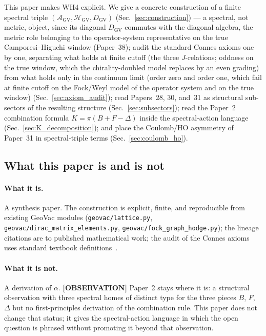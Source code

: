 \documentclass[11pt]{article}
\begin{document}
This paper makes WH4 explicit.  We give a concrete construction of a
finite spectral triple
$(\mathcal{A}_{\mathrm{GV}}, \mathcal{H}_{\mathrm{GV}},
D_{\mathrm{GV}})$ (Sec.~\ref{sec:construction}) --- a spectral, not
metric, object, since its diagonal $D_{\mathrm{GV}}$ commutes with the
diagonal algebra, the metric role belonging to the operator-system
representative on the true Camporesi--Higuchi window (Paper~38);
audit the standard Connes axioms one by one, separating
what holds at finite cutoff (the three $J$-relations; oddness on
the true window, which the chirality-doubled model replaces by an even
grading) from what holds only in the continuum limit (order zero and
order one, which fail at finite cutoff on the Fock/Weyl
model of the operator system and on the true window) (Sec.~\ref{sec:axiom_audit}); read
Papers~28, 30, and~31 as structural sub-sectors of the resulting
structure (Sec.~\ref{sec:subsectors}); read the Paper~2 combination
formula $K = \pi(B + F - \Delta)$ inside the spectral-action language
(Sec.~\ref{sec:K_decomposition}); and place the Coulomb/HO asymmetry
of Paper~31 in spectral-triple terms (Sec.~\ref{sec:coulomb_ho}).

\subsection{What this paper is and is not}

\paragraph{What it is.}  A synthesis paper.  The construction is
explicit, finite, and reproducible from existing GeoVac modules
(\texttt{geovac/lattice.py}, \texttt{geovac/dirac\_matrix\_elements.py},
\texttt{geovac/fock\_graph\_hodge.py}); the lineage citations are to
published mathematical work; the audit of the Connes axioms uses
standard textbook definitions~\cite{connes1995,connes_marcolli2008,%
vansuijlekom_book2015}.

\paragraph{What it is not.}  A derivation of $\alpha$.
\textbf{[OBSERVATION]} Paper~2 stays
where it is: a structural observation with three spectral
homes of distinct type for the three pieces $B$, $F$, $\Delta$ but no first-principles
derivation of the combination rule.  This paper does not change that
status; it gives the spectral-action language in which the open
question is phrased without promoting it beyond that observation.
\end{document}

